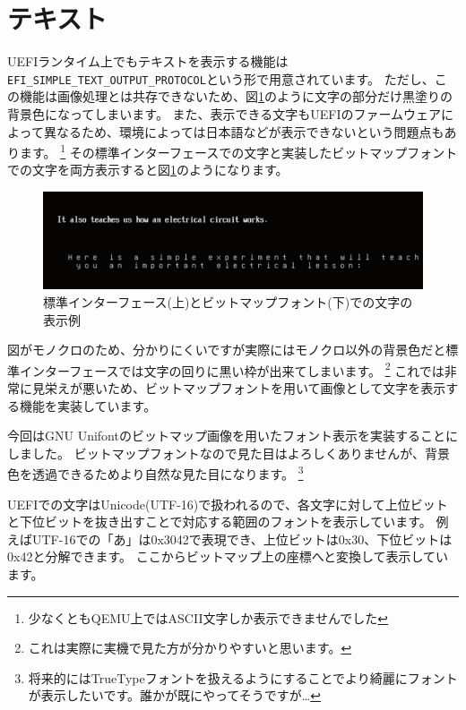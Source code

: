 \documentclass[10pt,b5paper,twoside,openany]{ltjsbook}
\begin{document}
\section{テキスト}
UEFIランタイム上でもテキストを表示する機能は\verb+EFI_SIMPLE_TEXT_OUTPUT_PROTOCOL+という形で用意されています。
ただし、この機能は画像処理とは共存できないため、図\ref{fig:defaultfont}のように文字の部分だけ黒塗りの背景色になってしまいます。
また、表示できる文字もUEFIのファームウェアによって異なるため、環境によっては日本語などが表示できないという問題点もあります。
\footnote{少なくともQEMU上ではASCII文字しか表示できませんでした}
その標準インターフェースでの文字と実装したビットマップフォントでの文字を両方表示すると図\ref{fig:defaultfont}のようになります。
\begin{figure}[H]
    \centering
    \includegraphics[scale=0.4]{pic/black.pdf}
    \caption{標準インターフェース(上)とビットマップフォント(下)での文字の表示例}
    \label{fig:defaultfont}
\end{figure}
図がモノクロのため、分かりにくいですが実際にはモノクロ以外の背景色だと標準インターフェースでは文字の回りに黒い枠が出来てしまいます。
\footnote{これは実際に実機で見た方が分かりやすいと思います。}
これでは非常に見栄えが悪いため、ビットマップフォントを用いて画像として文字を表示する機能を実装しています。

今回はGNU Unifontのビットマップ画像を用いたフォント表示を実装することにしました。
ビットマップフォントなので見た目はよろしくありませんが、背景色を透過できるためより自然な見た目になります。
\footnote{将来的にはTrueTypeフォントを扱えるようにすることでより綺麗にフォントが表示したいです。誰かが既にやってそうですが…}

UEFIでの文字はUnicode(UTF-16)で扱われるので、各文字に対して上位ビットと下位ビットを抜き出すことで対応する範囲のフォントを表示しています。
例えばUTF-16での「あ」は0x3042で表現でき、上位ビットは0x30、下位ビットは0x42と分解できます。
ここからビットマップ上の座標へと変換して表示しています。
\end{document}
